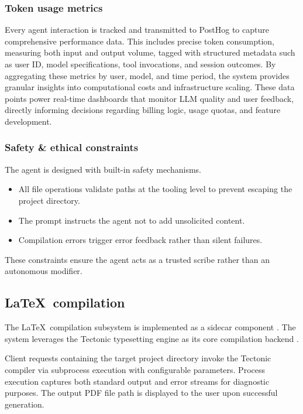 \subsubsection{Token usage metrics}

Every agent interaction is tracked and transmitted to PostHog \cite{posthog} to capture comprehensive performance data.
This includes precise token consumption, measuring both input and output volume, tagged with structured metadata such as user ID, model specifications, tool invocations, and session outcomes.
By aggregating these metrics by user, model, and time period, the system provides granular insights into computational costs and infrastructure scaling.
These data points power real-time dashboards that monitor LLM quality and user feedback, directly informing decisions regarding billing logic, usage quotas, and feature development.

\subsubsection{Safety \& ethical constraints}

The agent is designed with built-in safety mechanisms.

\begin{itemize}
    \item All file operations validate paths at the tooling level to prevent escaping the project directory.
    \item The prompt instructs the agent not to add unsolicited content.
    \item Compilation errors trigger error feedback rather than silent failures.
\end{itemize}
These constraints ensure the agent acts as a trusted scribe rather than an autonomous modifier.

\subsection{\LaTeX\ compilation}

The \LaTeX\ compilation subsystem is implemented as a sidecar component \cite{tauri_sidecar}.
The system leverages the Tectonic typesetting engine as its core compilation backend \cite{tectonic}.

Client requests containing the target project directory invoke the Tectonic compiler via subprocess execution with configurable parameters.
Process execution captures both standard output and error streams for diagnostic purposes.
The output PDF file path is displayed to the user upon successful generation.

